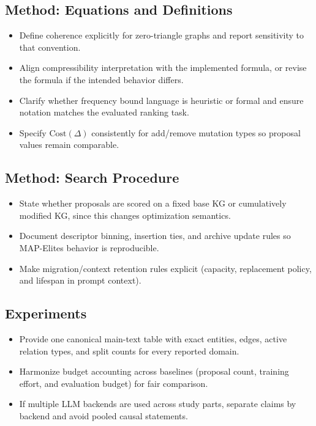 \documentclass[11pt]{article}
\begin{document}
\subsection*{Method: Equations and Definitions}
\begin{itemize}
  \item Define coherence explicitly for zero-triangle graphs and report sensitivity to that convention.
  \item Align compressibility interpretation with the implemented formula, or revise the formula if the intended behavior differs.
  \item Clarify whether frequency bound language is heuristic or formal and ensure notation matches the evaluated ranking task.
  \item Specify \(\mathrm{Cost}(\Delta)\) consistently for add/remove mutation types so proposal values remain comparable.
\end{itemize}

\subsection*{Method: Search Procedure}
\begin{itemize}
  \item State whether proposals are scored on a fixed base KG or cumulatively modified KG, since this changes optimization semantics.
  \item Document descriptor binning, insertion ties, and archive update rules so MAP-Elites behavior is reproducible.
  \item Make migration/context retention rules explicit (capacity, replacement policy, and lifespan in prompt context).
\end{itemize}

\subsection*{Experiments}
\begin{itemize}
  \item Provide one canonical main-text table with exact entities, edges, active relation types, and split counts for every reported domain.
  \item Harmonize budget accounting across baselines (proposal count, training effort, and evaluation budget) for fair comparison.
  \item If multiple LLM backends are used across study parts, separate claims by backend and avoid pooled causal statements.
\end{itemize}
\end{document}
